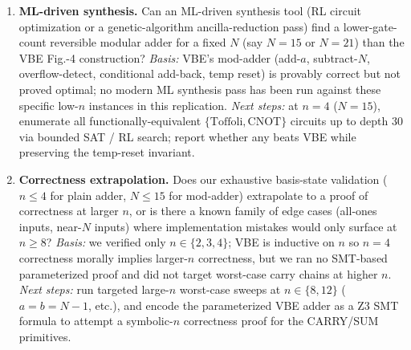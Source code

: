 \begin{enumerate}
\item \textbf{ML-driven synthesis.}
Can an ML-driven synthesis tool (RL circuit optimization or a genetic-algorithm
ancilla-reduction pass) find a lower-gate-count reversible modular adder for
a fixed $N$ (say $N{=}15$ or $N{=}21$) than the VBE Fig.-4 construction?
\emph{Basis:} VBE's mod-adder (add-$a$, subtract-$N$, overflow-detect,
conditional add-back, temp reset) is provably correct but not proved optimal;
no modern ML synthesis pass has been run against these specific low-$n$
instances in this replication.
\emph{Next steps:} at $n{=}4$ ($N{=}15$), enumerate all functionally-equivalent
$\{\text{Toffoli}, \text{CNOT}\}$ circuits up to depth 30 via bounded SAT / RL
search; report whether any beats VBE while preserving the temp-reset invariant.

\item \textbf{Correctness extrapolation.}
Does our exhaustive basis-state validation ($n \le 4$ for plain adder,
$N \le 15$ for mod-adder) extrapolate to a proof of correctness at larger $n$,
or is there a known family of edge cases (all-ones inputs, near-$N$ inputs)
where implementation mistakes would only surface at $n \ge 8$?
\emph{Basis:} we verified only $n \in \{2,3,4\}$; VBE is inductive on $n$ so
$n{=}4$ correctness morally implies larger-$n$ correctness, but we ran no
SMT-based parameterized proof and did not target worst-case carry chains at
higher $n$.
\emph{Next steps:} run targeted large-$n$ worst-case sweeps at
$n \in \{8, 12\}$ ($a{=}b{=}N{-}1$, etc.), and encode the parameterized VBE
adder as a Z3 SMT formula to attempt a symbolic-$n$ correctness proof for the
CARRY/SUM primitives.

\end{enumerate}
